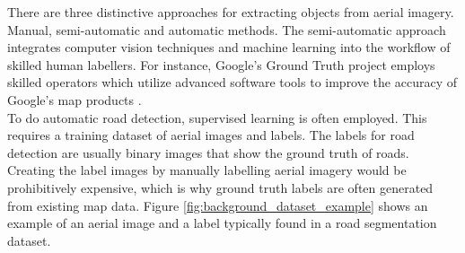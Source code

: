 There are three distinctive approaches for extracting objects from aerial imagery. Manual, semi-automatic and automatic methods. The semi-automatic approach integrates computer vision techniques and machine learning into the workflow of skilled human labellers. For instance, Google's Ground Truth project employs skilled operators which utilize advanced software tools to improve the accuracy of Google's map products \citep{Ground_truth}.\\

To do automatic road detection, supervised learning is often employed. This requires a training dataset of aerial images and labels. The labels for road detection are usually binary images that show the ground truth of roads. Creating the label images by manually labelling aerial imagery would be prohibitively expensive, which is why ground truth labels are often generated from existing map data. Figure \ref{fig:background_dataset_example} shows an example of an aerial image and a label typically found in a road segmentation dataset.\\

